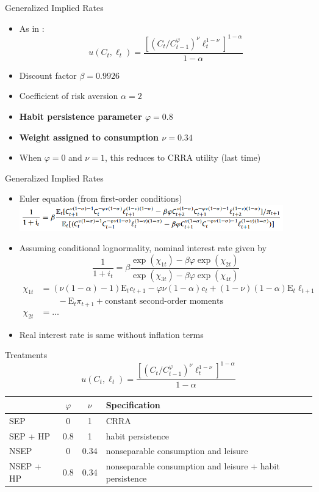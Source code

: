 \documentclass{beamer}
\def\E{\text{E}}
\begin{document}
\begin{frame}{Generalized Implied Rates}
\begin{itemize}
\item As in \cite{collard11}: $$u(C_t, \ell_t) = \frac{[(C_t/C_{t-1}^\varphi)^\nu \ell_t^{1-\nu}]^{1-\alpha}}{1-\alpha}$$
\item Discount factor $\beta = 0.9926$
\item Coefficient of risk aversion $\alpha = 2$
\item \textbf{Habit persistence parameter $\varphi = 0.8$}
\item \textbf{Weight assigned to consumption $\nu = 0.34$}
\item When $\varphi = 0$ and $\nu = 1$, this reduces to CRRA utility (last time)
\end{itemize}
\end{frame}

\begin{frame}{Generalized Implied Rates}
\begin{itemize}
\item Euler equation (from first-order conditions)
  \includegraphics[width=0.9\textwidth]{figs/euler-equation.png}
\item Assuming conditional lognormality, nominal interest rate given by
$$\frac{1}{1+i_t} = \beta \frac{\exp(\chi_{1t}) - \beta \varphi \exp(\chi_{2t})}{\exp(\chi_{3t}) - \beta \varphi \exp(\chi_{4t})}$$
\begin{align*}
\chi_{1t} &= (\nu(1-\alpha)-1) \E_t c_{t+1} - \varphi\nu(1-\alpha)c_t + (1-\nu)(1-\alpha) \E_t \ell_{t+1} \\
  &\qquad - \E_t \pi_{t+1} + \text{constant second-order moments} \\
\chi_{2t} &= \ldots
\end{align*}
\item Real interest rate is same without inflation terms
\end{itemize}
\end{frame}

\begin{frame}{Treatments}
$$u(C_t, \ell_t) = \frac{[(C_t/C_{t-1}^\varphi)^\nu \ell_t^{1-\nu}]^{1-\alpha}}{1-\alpha}$$
\bigskip
\begin{center}
\begin{tabular}{|l|c|c|p{}|} \hline
& $\varphi$ & $\nu$ & Specification \\ \hline
SEP & 0 & 1 & CRRA \\
SEP + HP & 0.8 & 1 & habit persistence \\
NSEP & 0 & 0.34 & nonseparable consumption and leisure \\
NSEP + HP & 0.8 & 0.34 & nonseparable consumption and leisure + habit persistence \\ \hline
\end{tabular}
\end{center}
\end{frame}
\end{document}
